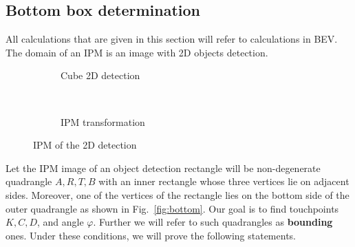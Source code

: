 \documentclass[graybox]{svmult}
\begin{document}
\subsection{Bottom box determination} \label{sec:comp}
All calculations that are given in this section will refer to calculations in BEV. The domain of an IPM is an image with 2D objects detection.\\

\begin{figure}%
    \centering
    \begin{subfigure}[t]{0.4\textwidth}
        \centering
            \resizebox{.9\textwidth}{!}{%
                 \usebox{\cube}
            }
        \caption{Cube 2D detection}
    \end{subfigure}%
    ~ 
    \begin{subfigure}[t]{0.4\textwidth}
 
         \resizebox{.6\textwidth}{!}{%
            \usebox{\icube}
            }
         \caption{IPM transformation}
    \end{subfigure}
    \caption{IPM of the 2D detection}
    \label{fig:ipm_cube}
\end{figure}


Let the IPM image of an object detection rectangle  will be non-degenerate quadrangle $A, R, T, B$ with an inner rectangle whose three vertices lie on adjacent sides. Moreover, one of the vertices of the rectangle lies on the bottom side of the outer quadrangle as shown in Fig.~\ref{fig:bottom}. Our goal is to find touchpoints $K, C, D$, and angle $\varphi$. Further we will refer to such quadrangles as \textbf{bounding} ones. Under these conditions, we will prove the following statements.
\end{document}
